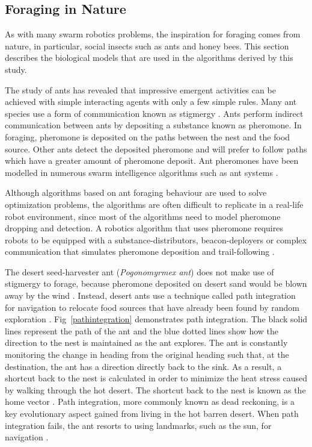 \documentclass[preprint,12pt]{elsarticle}
\begin{document}
\subsection{Foraging in Nature}
\label{foraginginnature}

As with many swarm robotics problems, the inspiration for foraging comes from nature, in particular, social insects such as ants and honey bees. This section describes the biological models that are used in the algorithms derived by this study. 

The study of ants has revealed that impressive emergent activities can be achieved with simple interacting agents with only a few simple rules. Many ant species use a form of communication known as stigmergy \cite{dorigo2000ant}. Ants perform indirect communication between ants by depositing a substance known as pheromone. In foraging, pheromone is deposited on the paths between the nest and the food source. Other ants detect the deposited pheromone and will prefer to follow paths which have a greater amount of pheromone deposit. Ant pheromones have been modelled in numerous swarm intelligence algorithms such as ant systems \cite{dorigo2006ant, dorigo2010ant}. 
 
Although algorithms based on ant foraging behaviour are used to solve optimization problems, the algorithms are often difficult to replicate in a real-life robot environment, since most of the algorithms need to model pheromone dropping and detection. A robotics algorithm that uses pheromone requires robots to be equipped with a substance-distributors, beacon-deployers or complex communication that simulates pheromone deposition and trail-following \cite{hoff2010two}.

The desert seed-harvester ant (\textit{Pogonomyrmex ant}) does not make use of stigmergy to forage, because pheromone deposited on desert sand would be blown away by the wind \cite{collett1992visual,hecker2015beyond}. Instead, desert ants use a technique called path integration for navigation to relocate food sources that have already been found by random exploration \cite{collett1998local,wehner2003desert}. Fig~\ref{pathintegration} demonstrates path integration. The black solid lines represent the path of the ant and the blue dotted lines show how the direction to the nest is maintained as the ant explores. The ant is constantly monitoring the change in heading from the original heading such that, at the destination, the ant has a direction directly back to the sink. As a result, a shortcut back to the nest is calculated in order to minimize the heat stress caused by walking through the hot desert. The shortcut back to the nest is known as the home vector \cite{muller1988path}. Path integration, more commonly known as dead reckoning, is a key evolutionary aspect gained from living in the hot barren desert. When path integration fails, the ant resorts to using landmarks, such as the sun, for navigation \cite{collett1998local}.
\end{document}
